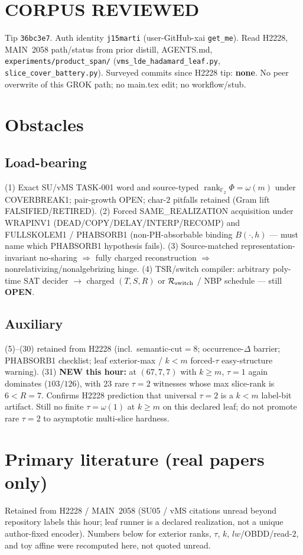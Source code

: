 \documentclass[11pt]{article}
\begin{document}
\section*{CORPUS REVIEWED}
Tip \texttt{36bc3e7}. Auth identity \texttt{j15marti} (user-GitHub-xai \texttt{get\_me}).
Read H2228, MAIN~2058 path/status from prior distill, AGENTS.md,
\texttt{experiments/product\_span/} (\texttt{vms\_lde\_hadamard\_leaf.py},
\texttt{slice\_cover\_battery.py}).
Surveyed commits since H2228 tip: \textbf{none}.
No peer overwrite of this GROK path; no main.tex edit; no workflow/stub.

\section*{Obstacles}
\subsection*{Load-bearing}
(1) Exact SU/vMS TASK-001 word and source-typed
$\operatorname{rank}_{\mathbb F_2}\Phi=\omega(m)$ under COVERBREAK1; pair-growth OPEN;
char-$2$ pitfalls retained (Gram lift FALSIFIED/RETIRED).
(2) Forced SAME\_REALIZATION acquisition under WRAPINV1
(DEAD/COPY/DELAY/INTERP/RECOMP) and FULLSKOLEM1 / PHABSORB1
(non-PH-absorbable binding $B(\cdot,h)$ --- must name which PHABSORB1 hypothesis fails).
(3) Source-matched representation-invariant no-sharing $\Rightarrow$ fully charged reconstruction
$\Rightarrow$ nonrelativizing/nonalgebrizing hinge.
(4) TSR/switch compiler: arbitrary poly-time SAT decider $\to$ charged $(T,S,R)$ or
$\mathcal R_{\rm switch}$ / NBP schedule --- still \textbf{OPEN}.

\subsection*{Auxiliary}
(5)--(30) retained from H2228 (incl.\ semantic-cut$=8$; occurrence-$\Delta$ barrier;
PHABSORB1 checklist; leaf exterior-max / $k{<}m$ forced-$\tau$ easy-structure warning).
(31) \textbf{NEW this hour:} at $(67,7,7)$ with $k{\ge}m$, $\tau{=}1$ again dominates
($103/126$), with $23$ rare $\tau{=}2$ witnesses whose max slice-rank is $6{<}R{=}7$.
Confirms H2228 prediction that universal $\tau{=}2$ is a $k{<}m$ label-bit artifact.
Still no finite $\tau=\omega(1)$ at $k{\ge}m$ on this declared leaf; do not promote rare
$\tau{=}2$ to asymptotic multi-slice hardness.

\section*{Primary literature (real papers only)}
Retained from H2228 / MAIN~2058 (SU05 / vMS citations unread beyond repository labels this hour;
leaf runner is a declared realization, not a unique author-fixed encoder).
Numbers below for exterior ranks, $\tau$, $k$, $lw$/OBDD/read-$2$, and toy affine
were recomputed here, not quoted unread.
\end{document}
